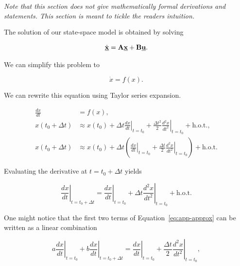 \documentclass[11pt,titlepage]{report}
\begin{document}
\begin{appendices}
\textit{Note that this section does not give mathematically formal derivations and statements. This section is meant to tickle the readers intuition.}

The solution of our state-space model is obtained by solving

\begin{equation}
	\dot{\mathbf{\underline{x}}}=\mathbf{A}\mathbf{\underline{x}}+\mathbf{B}\mathbf{\underline{u}}.
\end{equation}

We can simplify this problem to 

\begin{equation}
	\dot{x}=f(x).
\end{equation}

We can rewrite this equation using Taylor series expansion.

\begin{align}
	\frac{dx}{dt} &= f(x), \\
	x(t_0+\Delta t) &\approx
		x(t_0)+
		\left. \Delta t \frac{dx}{dt} \right|_{t=t_0}+
		\frac{\Delta t^2}{2}\left. \frac{d^2x}{dt^2} \right|_{t=t_0}+
		\text{h.o.t.}, \\
	x(t_0+\Delta t) &\approx
		x(t_0)+
		\Delta t \left(
			\left. \frac{dx}{dt} \right|_{t=t_0}+
			\frac{\Delta t}{2}\left. \frac{d^2x}{dt^2} \right|_{t=t_0}
		\right) + \text{h.o.t.} \label{eq:app-approx}
\end{align}

Evaluating the derivative at $t=t_0+\Delta t$ yields

\begin{equation}
	\left. \frac{dx}{dt} \right|_{t=t_0+\Delta t} = 
		\left. \frac{dx}{dt} \right|_{t=t_0} +
		\Delta t \left. \frac{d^2x}{dt^2} \right|_{t=t_0} +
		\text{h.o.t.}
\end{equation}

One might notice that the first two terms of Equation~\ref{eq:app-approx} can be written as a linear combination

\begin{equation}
	a \left. \frac{dx}{dt} \right|_{t=t_0} +
	b \left. \frac{dx}{dt} \right|_{t=t_0+\Delta t} =
		\left. \frac{dx}{dt} \right|_{t=t_0}+
		\frac{\Delta t}{2}\left. \frac{d^2x}{dt^2} \right|_{t=t_0},
\end{equation}


\end{appendices}
\end{document}
